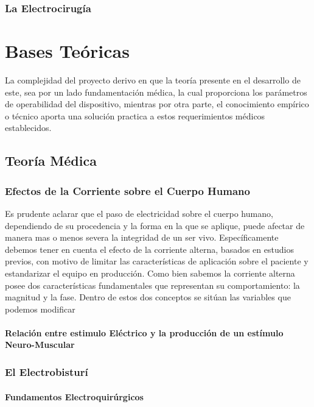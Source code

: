 \documentclass[12pt,letterpaper,spanish]{article}
\begin{document}
			
			\subsubsection{La Electrocirugía}
			
	
	\section{Bases Teóricas}
	La complejidad del proyecto derivo en que la teoría presente en el desarrollo de este, sea por un lado fundamentación médica, la cual proporciona los parámetros de operabilidad del dispositivo, mientras por otra parte, el conocimiento empírico o técnico aporta una solución practica a estos requerimientos médicos establecidos.   	
	
		\subsection{Teoría Médica}
		
		
			\subsubsection{Efectos de la Corriente sobre el Cuerpo Humano}	
			Es prudente aclarar que el paso de electricidad sobre el cuerpo humano, dependiendo de su procedencia y la forma en la que se aplique, puede afectar de manera mas o menos severa la integridad de un ser vivo. Específicamente debemos tener en cuenta el efecto de la corriente alterna, basados en estudios previos, con motivo de limitar las características de aplicación sobre el paciente y estandarizar el equipo en producción.
			Como bien sabemos la corriente alterna posee dos características fundamentales que representan su comportamiento: la magnitud y la fase. Dentro de estos dos conceptos se sitúan las variables que podemos modificar      		
			
				\paragraph{Relación entre estimulo Eléctrico y la producción de un estímulo Neuro-Muscular }	
			\subsubsection{El Electrobisturí}
			
				\paragraph{Fundamentos Electroquirúrgicos}
\end{document}
